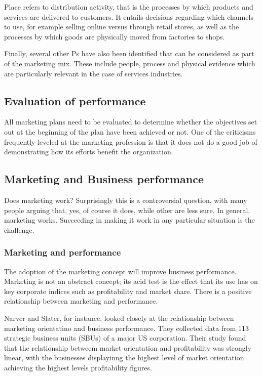 \documentclass{article}
\begin{document}
Place refers to distribution activity, that is the processes by which products and services are delivered to customers. It entails decisions regarding which channels to use, for example selling online versus through retail stores, as well as the processes by which goods are physically moved from factories to shops.

Finally, several other Ps have also been identified that can be considered as part of the marketing mix. These include people, process and physical evidence which are particularly relevant in the case of services industries.

\subsection{Evaluation of performance}
All marketing plans need to be evaluated to determine whether the objectives set out at the beginning of the plan have been achieved or not. One of the criticisms frequently leveled at the marketing profession is that it does not do a good job of demonstrating how its efforts benefit the organization.

\subsection{Marketing and Business performance}
Does marketing work? Surprisingly this is a controversial question, with many people arguing that, yes, of course it does, while other are less sure. In general, marketing works. Succeeding in making it work in any particular situation is the challenge. 

\subsubsection*{Marketing and performance}
The adoption of the marketing concept will improve business performance. Marketing is not an abstract concept; its acid test is the effect that its use has on key corporate indices such as profitability and market share. There is a positive relationship between marketing and performance.

Narver and Slater, for instance, looked closely at the relationship between marketing orientatino and business performance. They collected data from 113 strategic business units (SBUs) of a major US corporation. Their study found that the relationship betweem market orientation and profitability was strongly linear, with the businesses displayinng the highest level of market orientation achieving the highest levels profitability figures.
\end{document}
